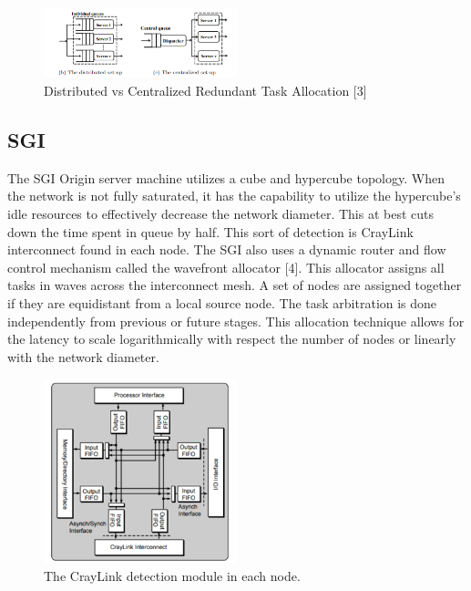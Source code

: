 \documentclass[letterpaper, 10 pt, conference]{ieeeconf}
\begin{document}
\begin{figure}[!ht] %
	\centering
	\includegraphics [width=0.5\textwidth] {Distr_vs_Centralized_Servers.PNG} 
    \caption{Distributed vs Centralized Redundant Task Allocation [3]}
\end{figure}

\subsection{SGI}

The SGI Origin server machine utilizes a cube and hypercube topology.  When the network is not fully saturated, it has the capability to utilize the hypercube's idle resources to effectively decrease the network diameter.  This at best cuts down the time spent in queue by half.  This sort of detection is CrayLink interconnect found in each node.  The SGI also uses a dynamic router and flow control mechanism called the wavefront allocator [4].  This allocator assigns all tasks in waves across the interconnect mesh.  A set of nodes are assigned together if they are equidistant from a local source node.  The task arbitration is done independently from previous or future stages.  This allocation technique allows for the latency to scale logarithmically with respect the number of nodes or linearly with the network diameter.

\begin{figure}[!ht] %
	\centering
	\includegraphics [width=0.5\textwidth] {CrayLink.png} 
    \caption{The CrayLink detection module in each node.}
\end{figure}
\end{document}

